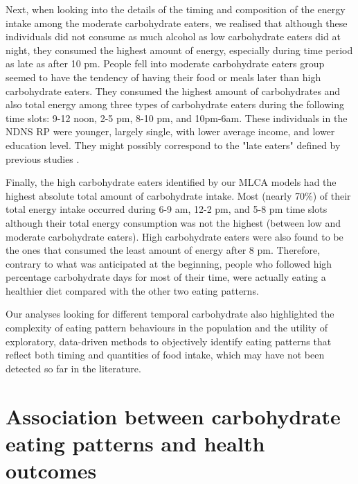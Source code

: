 Next, when looking into the details of the timing and composition of the energy intake among the moderate carbohydrate eaters, we realised that although these individuals did not consume as much alcohol as low carbohydrate eaters did at night, they consumed the highest amount of energy, especially during time period as late as after 10 pm. People fell into moderate carbohydrate eaters group seemed to have the tendency of having their food or meals later than high carbohydrate eaters. They consumed the highest amount of carbohydrates and also total energy among three types of carbohydrate eaters during the following time slots: 9-12 noon, 2-5 pm, 8-10 pm, and 10pm-6am. These individuals in the NDNS RP were younger, largely single, with lower average income, and lower education level. They might possibly correspond to the "late eaters" defined by previous studies \parencite{leech2017temporal, mansukhani2018investigating}. 

Finally, the high carbohydrate eaters identified by our MLCA models had the highest absolute total amount of carbohydrate intake. Most (nearly 70\%) of their total energy intake occurred during 6-9 am, 12-2 pm, and 5-8 pm time slots although their total energy consumption was not the highest (between low and moderate carbohydrate eaters). High carbohydrate eaters were also found to be the ones that consumed the least amount of energy after 8 pm. Therefore, contrary to what was anticipated at the beginning, people who followed high percentage carbohydrate days for most of their time, were actually eating a healthier diet compared with the other two eating patterns. 

Our analyses looking for different temporal carbohydrate also highlighted the complexity of eating pattern behaviours in the population and the utility of exploratory, data-driven methods to objectively identify eating patterns that reflect both timing and quantities of food intake, which may have not been detected so far in the literature.


\section{Association between carbohydrate eating patterns and health outcomes}

